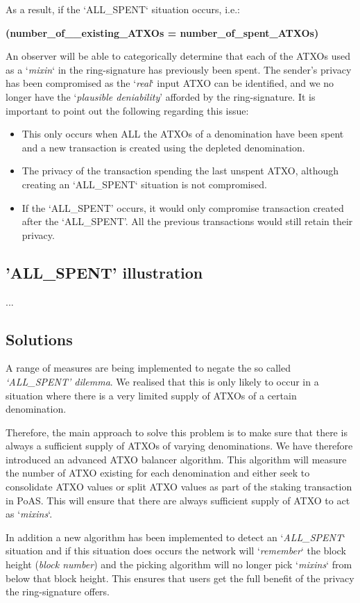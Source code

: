 

As a result, if the ‘ALL\_SPENT‘ situation occurs, i.e.: 

 

\textbf{(number\_of\_\_existing\_ATXOs = number\_of\_spent\_ATXOs) }

 

An observer will be able to categorically determine that each of the ATXOs 
used as a ‘\textit{mixin}‘ in the ring-signature has previously been spent. 
The sender’s privacy has been compromised as the ‘\textit{real}‘ input ATXO 
can be identified, and we no longer have the ‘\textit{plausible deniability}’ 
afforded by the ring-signature. It is important to point out the following 
regarding this issue: 



\begin{itemize}
	\item This only occurs when ALL the ATXOs of a denomination have been 
	spent and a new transaction is created using the depleted denomination.
	\item The privacy of the transaction spending the last unspent ATXO, 
	although creating an ‘ALL\_SPENT‘ situation is not compromised.
	\item If the ‘ALL\_SPENT’ occurs, it would only compromise transaction 
	created after the ‘ALL\_SPENT’. All the previous transactions would still 
	retain their privacy.
\end{itemize}



\subsection{'ALL\_SPENT' illustration}

...

\subsection{Solutions}
A range of measures are being implemented to negate the so called 
\textit{‘ALL\_SPENT’ dilemma}. We realised that this is only likely 
to occur in a situation where there is a very limited supply of 
ATXOs of a certain denomination. 

Therefore, the main approach to solve this problem is to make sure that 
there is always a sufficient supply of ATXOs of varying denominations. 
We have therefore introduced an advanced ATXO balancer algorithm. This 
algorithm will measure the number of ATXO existing for each denomination 
and either seek to consolidate ATXO values or split ATXO values as part 
of the staking transaction in PoAS. This will ensure that there are 
always sufficient supply of ATXO to act as ‘\textit{mixins}‘. 



In addition a new algorithm has been implemented to detect an 
‘\textit{ALL\_SPENT}‘ situation and if this situation does occurs 
the network will ‘\textit{remember}‘ the block height (\textit{block number}) 
and the picking algorithm will no longer pick ‘\textit{mixins}‘ 
from below that block height. This ensures that users get the full 
benefit of the privacy the ring-signature offers. 
